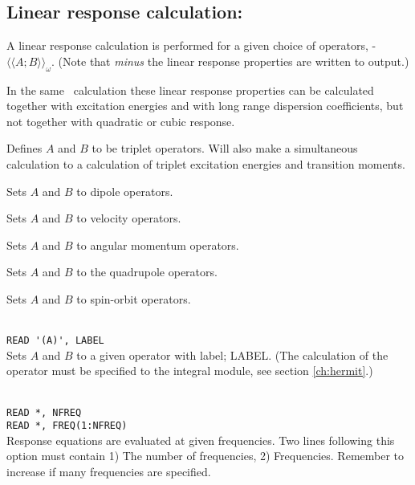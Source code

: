 \subsection{Linear response calculation: }

A linear response
\cite{jodlypjjcp91,pjhjajjojcp89} calculation is performed for a given
choice of operators,
-$\langle\!\langle A; B \rangle\!\rangle_{\omega}$.
(Note that {\em minus} the linear response properties are written to output.)

In the same \resp\ calculation these linear response properties can be calculated
together with excitation energies
and with long range dispersion coefficients, but not 
together with quadratic or cubic response.

\begin{description}

\item{} Defines $A$ and $B$ to be triplet operators.
Will also make a simultaneous   calculation to
a calculation of triplet excitation energies and transition moments.

\item{}
Sets $A$ and $B$ to dipole operators.

\item{}
Sets $A$ and $B$ to velocity operators.

\item{}
Sets $A$ and $B$ to angular momentum operators.

\item{}
Sets $A$ and $B$ to the quadrupole operators.

\item{}
Sets $A$ and $B$ to spin-orbit operators.

\item{}\\
\verb|READ '(A)', LABEL|\\
Sets $A$ and $B$ to a given operator with label; LABEL.
(The calculation of the operator must be specified to the integral
module, see section \ref{ch:hermit}.)

\item{}\\
\verb|READ *, NFREQ|\\
\verb|READ *, FREQ(1:NFREQ)|\\
Response equations are evaluated at given
frequencies. Two lines following 
this option must contain 1) The number of frequencies, 2) Frequencies.
Remember to increase  if many frequencies are specified.


\end{description}

